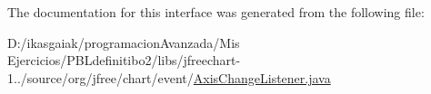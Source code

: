 The documentation for this interface was generated from the following file\+:\begin{DoxyCompactItemize}
\item 
D\+:/ikasgaiak/programacion\+Avanzada/\+Mis Ejercicios/\+P\+B\+Ldefinitibo2/libs/jfreechart-\/1../source/org/jfree/chart/event/\mbox{\hyperlink{_axis_change_listener_8java}{Axis\+Change\+Listener.\+java}}\end{DoxyCompactItemize}
